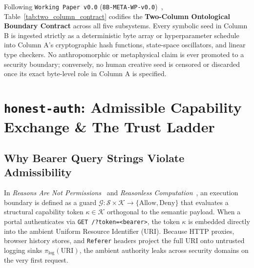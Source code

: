 \documentclass[10pt,twocolumn,letterpaper]{article}
\begin{document}
Following \texttt{Working Paper v0.0} (\texttt{8B-META-WP-v0.0})~\cite{lodri2026wp0}, Table~\ref{tab:two_column_contract} codifies the \textbf{Two-Column Ontological Boundary Contract} across all five subsystems. Every symbolic seed in Column B is ingested strictly as a deterministic byte array or hyperparameter schedule into Column A's cryptographic hash functions, state-space oscillators, and linear type checkers. No anthropomorphic or metaphysical claim is ever promoted to a security boundary; conversely, no human creative seed is censored or discarded once its exact byte-level role in Column A is specified.

\section{\texttt{honest-auth}: Admissible Capability Exchange \& The Trust Ladder}

\subsection{Why Bearer Query Strings Violate Admissibility}
In \emph{Reasons Are Not Permissions}~\cite{guimond2026reasons} and \emph{Reasonless Computation}~\cite{guimond2026reasonless}, an execution boundary is defined as a guard $\mathcal{G}: \mathcal{S} \times \mathcal{K} \to \{\text{Allow}, \text{Deny}\}$ that evaluates a structural capability token $\kappa \in \mathcal{K}$ orthogonal to the semantic payload. When a portal authenticates via \texttt{GET /?token=<bearer>}, the token $\kappa$ is embedded directly into the ambient Uniform Resource Identifier (URI). Because HTTP proxies, browser history stores, and \texttt{Referer} headers project the full URI onto untrusted logging sinks $\pi_{\text{log}}(\text{URI})$, the ambient authority leaks across security domains on the very first request.
\end{document}
